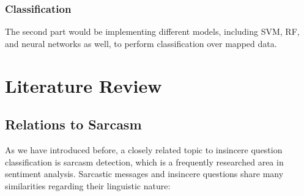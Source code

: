 \documentclass[12pt]{diazessay} %
\begin{document}
\subsubsection{Classification}

The second part would be implementing different models, including SVM, RF, and neural networks as well, to perform classification over mapped data.


\section{Literature Review}


\subsection{Relations to Sarcasm} \label{relations-to-sarcasm}

As we have introduced before, a closely related topic to insincere question classification is sarcasm detection, which is a frequently researched area in sentiment analysis\citep{joshi2017}. Sarcastic messages and insincere questions share many similarities regarding their linguistic nature:
\end{document}
